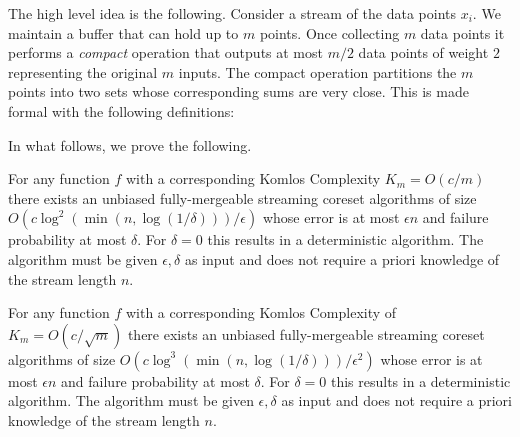 \documentclass[anon,12pt]{colt2019} %
\newtheorem{fact}[theorem]{Fact}
\newcommand{\eps}{\epsilon}
\begin{document}
The high level idea is the following. 
Consider a stream of the data points $x_i$. 
We maintain a buffer that can hold up to $m$ points.
Once collecting $m$ data points it performs a \emph{compact} operation that outputs at most $m/2$ data points of weight $2$ representing the original $m$ inputs. The compact operation partitions the $m$ points into two sets whose corresponding sums are very close. 
This is made formal with the following definitions: 

In what follows, we prove the following.
\begin{theorem} \label{thm:streaming}
For any function $f$ with a corresponding Komlos Complexity $K_m = O(c/m)$ there exists an unbiased fully-mergeable streaming coreset algorithms of size 
$O\left(c\log^2\left(\min(n, \log(1/\delta)) \right)/\eps\right)$ whose error is at most $\eps n$ and failure probability at most $\delta$. For $\delta=0$ this results in a deterministic algorithm. The algorithm must be given $\eps, \delta$ as input and does not require a priori knowledge of the stream length $n$.
\end{theorem}


\begin{theorem}
For any function $f$ with a corresponding Komlos Complexity of $K_m = O(c/\sqrt{m})$ there exists an unbiased fully-mergeable streaming coreset algorithms of size 
$O\left(c\log^3\left(\min(n, \log(1/\delta)) \right)/\eps^2\right)$ whose error is at most $\eps n$ and failure probability at most $\delta$. For $\delta=0$ this results in a deterministic algorithm. The algorithm must be given $\eps, \delta$ as input and does not require a priori knowledge of the stream length $n$.
\end{theorem}
%
%
\end{document}

